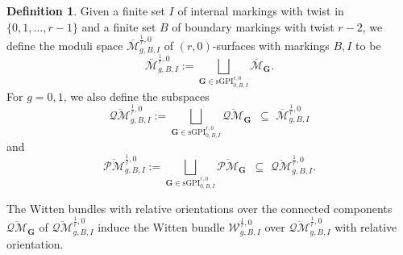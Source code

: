 \documentclass[11pt]{amsart}
\theoremstyle{definition}
\newtheorem{dfn}[dummy]{Definition}
\theoremstyle{remark}
\newcommand{\oPMb}{{\overline{\mathcal{PM}}}}
\newcommand{\oQMb}{{\overline{\mathcal{QM}}}}
\newcommand{\<}{\left<}
\renewcommand{\>}{\right>}
\numberwithin{equation}{section}
\def\Mbar{{\overline{\mathcal M}}}
\def\sGPI{\text{sGPI}}
\begin{document}
\begin{dfn} Given a finite set $I$ of internal markings with twist in $\{0,1,\dots,r-1\}$ and a finite set $B$ of boundary markings with twist $r-2$, we define the moduli space $\Mbar^{\frac{1}{r},0}_{g,B,I}$ of $(r,0)$-surfaces with markings $B,I$ to be
\begin{equation}\label{eq def moduli point insertion}
    \Mbar^{\frac{1}{r},0}_{g,B,I}:=\bigsqcup_{\mathbf{G}\in \sGPI^{r,0}_{0,B,I}}\Mbar_\mathbf{G}.
\end{equation}
For $g=0,1$, we also define the subspaces
\begin{equation}\label{eq def Q moduli point insertion}
    \oQMb^{\frac{1}{r},0}_{g,B,I}:=\bigsqcup_{\mathbf{G}\in \sGPI^{r,0}_{0,B,I}}\!\! \!\! \oQMb_\mathbf{G} \, \, \,\subseteq  \, \,\Mbar^{\frac{1}{r},0}_{g,B,I}
\end{equation}
and 
\begin{equation}\label{eq def P moduli point insertion}
    \oPMb^{\frac{1}{r},0}_{g,B,I}:=\bigsqcup_{\mathbf{G}\in \sGPI^{r,0}_{0,B,I}}\!\! \!\! \oPMb_\mathbf{G} \, \, \,\subseteq  \, \,\oQMb^{\frac{1}{r},0}_{g,B,I}.
\end{equation}

The Witten bundles with relative orientations over the connected components $\oQMb_\mathbf{G}$ of $\oQMb^{\frac{1}{r},0}_{g,B,I}$ induce the Witten bundle $\mathcal W^{\frac{1}{r},0}_{g,B,I}$ over $\oQMb^{\frac{1}{r},0}_{g,B,I}$ with relative orientation.
\end{dfn}
\end{document}
